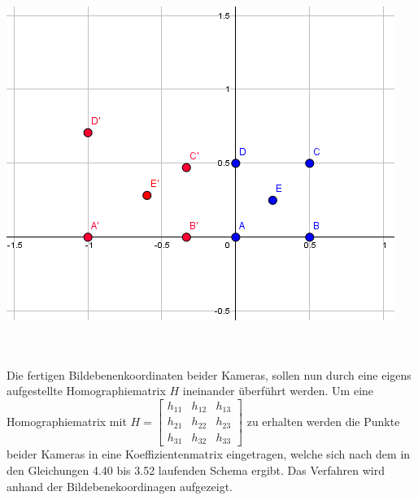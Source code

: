 \begin{minipage}{\linewidth}
	\centering
	\includegraphics[width=0.8\linewidth]{images/Geogebra.png}
\end{minipage}\\ \\

Die fertigen Bildebenenkoordinaten beider Kameras, sollen nun durch eine eigens aufgestellte Homographiematrix $H$ ineinander überführt werden. Um eine Homographiematrix mit 
$H=
\begin{bmatrix}
h_{11}&h_{12}&h_{13}\\
h_{21}&h_{22}&h_{23}\\
h_{31}&h_{32}&h_{33}
\end{bmatrix}
$ zu erhalten werden die Punkte beider Kameras in eine Koeffizientenmatrix eingetragen, welche sich nach dem in den Gleichungen 4.40 bis 3.52 laufenden Schema ergibt. Das Verfahren wird anhand der Bildebenekoordinagen aufgezeigt.

